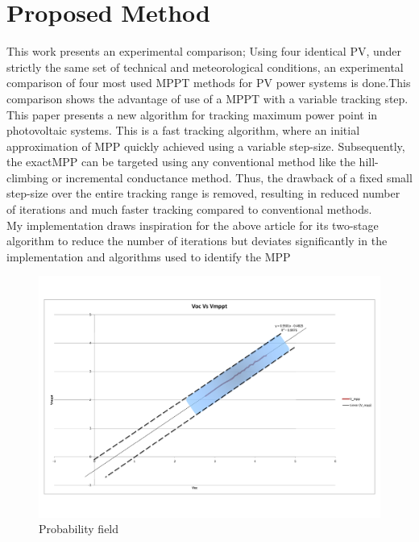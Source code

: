 \section{Proposed Method }

\cite{houssamo2013experimental}

This work presents an experimental comparison; Using four identical PV, under strictly the same set of technical and meteorological conditions, an experimental comparison  of four most used MPPT methods for PV power systems is done.This comparison shows the advantage of use of a MPPT with a variable tracking step.\\  

\cite{jain2004new}
This paper presents a new algorithm for tracking maximum power point in photovoltaic systems. This is a fast tracking algorithm, where an initial approximation of \ac{MPP} quickly achieved using a variable step-size. Subsequently, the exact\ac{MPP} can be targeted using any conventional method like the hill-climbing or incremental conductance method. Thus, the drawback of a fixed small step-size over the entire tracking range is removed, resulting in reduced number of iterations and much faster tracking compared to conventional methods. \\
 My implementation draws inspiration for the above article for its  two-stage algorithm to reduce the number of iterations but deviates significantly in the implementation and algorithms used to identify the \ac{MPP} 
 
\cite{liu2011fast}

\begin{figure}[H]
  \begin{center}
	  \includegraphics[width=1.1\textwidth]{images/Probability_field}
	  \caption{Probability field }
	  \label{fig:Probability_field}
  \end{center}
\end{figure}


